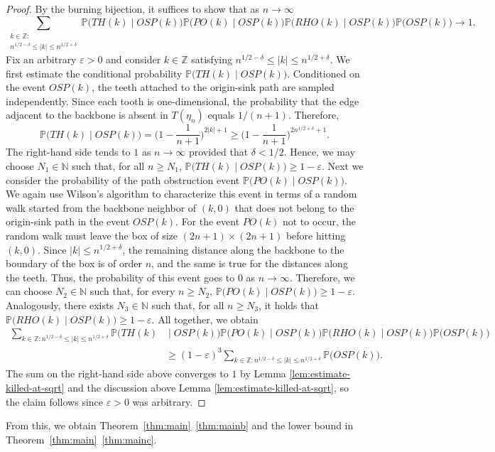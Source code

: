 \documentclass[11pt]{article}
\newcommand{\Z}{\mathbb{Z}}
\newcommand{\Prob}{\mathbb{P}}
\begin{document}
\begin{proof}
    By the burning bijection, it suffices to show that as $n\to\infty$
    \[
    \sum_{\substack{k\in\Z:\\ n^{1/2-\delta}\leq|k|\leq n^{1/2+\delta}}}\Prob\big(TH(k)\;|\;OSP(k)\big)\Prob\big(PO(k)\;|\;OSP(k)\big)\Prob\big(RHO(k)\;|\;OSP(k)\big)\Prob\big(OSP(k)\big)\to 1.
    \]
    Fix an arbitrary $\varepsilon>0$ and consider $k\in\mathbb{Z}$ satisfying $n^{1/2-\delta}\leq |k|\leq n^{1/2+\delta}$. We first estimate the conditional probability $\Prob\big(TH(k)\mid OSP(k)\big)$.
    Conditioned on the event $OSP(k)$, the teeth attached to the origin-sink path are sampled independently. Since each tooth is one-dimensional, the probability that the edge adjacent to the backbone is absent in $T(\eta_n)$ equals $1/(n+1)$. Therefore,
    \[
    \Prob\big(TH(k)\;|\;OSP(k)\big)=\Big(1-\frac{1}{n+1}\Big)^{2|k|+1}\geq \Big(1-\frac{1}{n+1}\Big)^{2n^{1/2+\delta}+1}.
    \]
    The right-hand side tends to $1$ as $n\to\infty$ provided that $\delta<1/2$. Hence, we may choose $N_1\in\mathbb{N}$ such that, for all $n\geq N_1$,  $\Prob\big(TH(k)\mid OSP(k)\big)\geq 1-\varepsilon $.
    Next we consider the probability of the path obstruction event $\Prob\big(PO(k)\;|\;OSP(k)\big)$.
    We again use Wilson's algorithm to characterize this event in terms of a random walk started from the backbone neighbor of $(k,0)$ that does not belong to the origin-sink path in the event $OSP(k)$. For the event $PO(k)$ not to occur, the random walk must leave the box of size $(2n+1)\times(2n+1)$ before hitting $(k,0)$. Since $|k|\leq n^{1/2+\delta}$, the remaining distance along the backbone to the boundary of the box is of order $n$, and the same is true for the distances along the teeth.   Thus, the probability of this event goes to $0$ as $n\to \infty$. Therefore, we can choose $N_2\in\mathbb{N}$ such that, for every $n\geq N_2$, $\Prob\big(PO(k)\mid OSP(k)\big)\geq 1-\varepsilon$. Analogously, there exists $N_3\in\mathbb{N}$ such that, for all $n\geq N_3$, it holds that $\Prob\big(RHO(k)\mid OSP(k)\big)\geq 1-\varepsilon$.
    All together, we obtain
    \begin{align*}
        \sum_{k\in\Z:n^{1/2-\delta}\leq|k|\leq n^{1/2+\delta}}\Prob\big(TH(k)&\;|\;OSP(k)\big)\Prob\big(PO(k)\;|\;OSP(k)\big)\Prob\big(RHO(k)\;|\;OSP(k)\big)\Prob\big(OSP(k)\big)\\
        &\geq (1-\varepsilon)^3\sum_{k\in\Z:n^{1/2-\delta}\leq|k|\leq n^{1/2+\delta}}\Prob\big(OSP(k)\big).
    \end{align*}
    The sum on the right-hand side above converges to $1$ by Lemma \ref{lem:estimate-killed-at-sqrt} and the discussion above Lemma \ref{lem:estimate-killed-at-sqrt}, so the claim follows since $\varepsilon>0$ was arbitrary.
\end{proof}
From this, we obtain Theorem~\ref{thm:main}~\ref{thm:mainb}  and the lower bound in Theorem~\ref{thm:main}~\ref{thm:mainc}.
\end{document}
